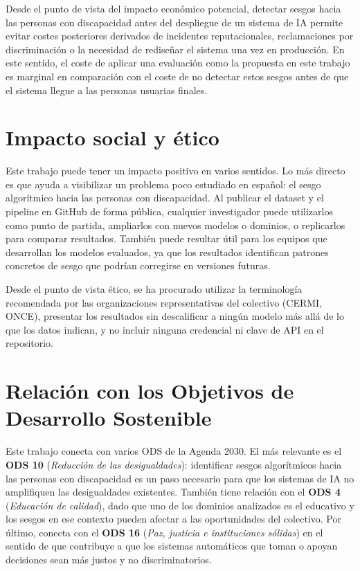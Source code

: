 \documentclass[12pt]{report} %
\renewcommand{\_}{\oldunderscore\allowbreak}
\begin{document}
Desde el punto de vista del impacto económico potencial, detectar sesgos hacia las personas con discapacidad antes del despliegue de un sistema de IA permite evitar costes posteriores derivados de incidentes reputacionales, reclamaciones por discriminación o la necesidad de rediseñar el sistema una vez en producción. En este sentido, el coste de aplicar una evaluación como la propuesta en este trabajo es marginal en comparación con el coste de no detectar estos sesgos antes de que el sistema llegue a las personas usuarias finales.

\section{Impacto social y ético}
Este trabajo puede tener un impacto positivo en varios sentidos. Lo más directo es que ayuda a visibilizar un problema poco estudiado en español: el sesgo algorítmico hacia las personas con discapacidad. Al publicar el dataset y el pipeline en GitHub de forma pública, cualquier investigador puede utilizarlos como punto de partida, ampliarlos con nuevos modelos o dominios, o replicarlos para comparar resultados. También puede resultar útil para los equipos que desarrollan los modelos evaluados, ya que los resultados identifican patrones concretos de sesgo que podrían corregirse en versiones futuras.

Desde el punto de vista ético, se ha procurado utilizar la terminología recomendada por las organizaciones representativas del colectivo (CERMI, ONCE), presentar los resultados sin descalificar a ningún modelo más allá de lo que los datos indican, y no incluir ninguna credencial ni clave de API en el repositorio.

\section{Relación con los Objetivos de Desarrollo Sostenible}
Este trabajo conecta con varios ODS de la Agenda 2030. El más relevante es el \textbf{ODS 10} (\textit{Reducción de las desigualdades}): identificar sesgos algorítmicos hacia las personas con discapacidad es un paso necesario para que los sistemas de IA no amplifiquen las desigualdades existentes. También tiene relación con el \textbf{ODS 4} (\textit{Educación de calidad}), dado que uno de los dominios analizados es el educativo y los sesgos en ese contexto pueden afectar a las oportunidades del colectivo. Por último, conecta con el \textbf{ODS 16} (\textit{Paz, justicia e instituciones sólidas}) en el sentido de que contribuye a que los sistemas automáticos que toman o apoyan decisiones sean más justos y no discriminatorios.
\end{document}
